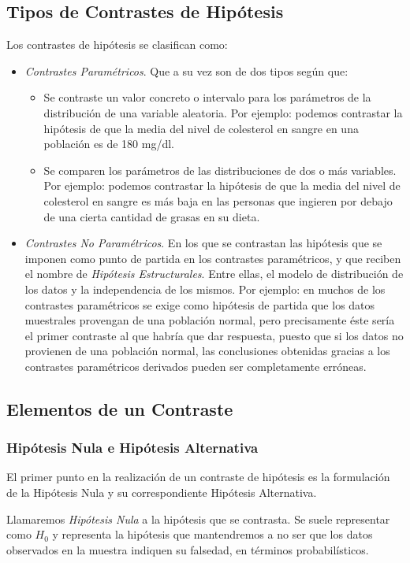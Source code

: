 \subsection{Tipos de Contrastes de Hipótesis}
Los contrastes de hipótesis se clasifican como:
\begin{itemize}
\item \emph{Contrastes Paramétricos}.
Que a su vez son de dos tipos según que:
\begin{itemize}
\item Se contraste un valor concreto o intervalo para los parámetros de la distribución de una variable aleatoria.
Por ejemplo: podemos contrastar la hipótesis de que la media del nivel de colesterol en sangre en una población es de
180 mg/dl.
\item Se comparen los parámetros de las distribuciones de dos o más variables. Por ejemplo: podemos contrastar la
hipótesis de que la media del nivel de colesterol en sangre es más baja en las personas que ingieren por debajo de una
cierta cantidad de grasas en su dieta.
\end{itemize}
\item \emph{Contrastes No Paramétricos}. En los que se contrastan las hipótesis que se imponen como punto de partida en
los contrastes paramétricos, y que reciben el nombre de \emph{Hipótesis Estructurales}.
Entre ellas, el modelo de distribución de los datos y la independencia de los mismos.
Por ejemplo: en muchos de los contrastes paramétricos se exige como hipótesis de partida que los datos muestrales
provengan de una población normal, pero precisamente éste sería el primer contraste al que habría que dar respuesta,
puesto que si los datos no provienen de una población normal, las conclusiones obtenidas gracias a los contrastes
paramétricos derivados pueden ser completamente erróneas.
\end{itemize}


\subsection{Elementos de un Contraste}
\subsubsection{Hipótesis Nula e Hipótesis Alternativa}
El primer punto en la realización de un contraste de hipótesis es la formulación de la Hipótesis Nula y su
correspondiente Hipótesis Alternativa.

Llamaremos \emph{Hipótesis Nula} a la hipótesis que se contrasta.
Se suele representar como $H_0$ y representa la hipótesis que mantendremos a no ser que los datos observados en la
muestra indiquen su falsedad, en términos probabilísticos.

